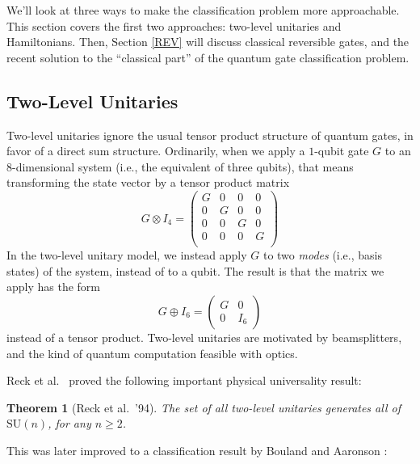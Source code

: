 \documentclass[11pt]{report}
\theoremstyle{plain}
\newtheorem{theorem}{Theorem}[section]
\theoremstyle{definition}
\begin{document}
We'll look at three ways to make the classification problem more approachable. This section covers the first two approaches: two-level unitaries and Hamiltonians.  Then, Section \ref{REV} will discuss classical reversible gates, and the recent solution to the ``classical part'' of the quantum gate classification problem.

\subsection{Two-Level Unitaries}

Two-level unitaries ignore the usual tensor product structure of quantum gates, in favor of a direct sum structure. Ordinarily, when we apply a $1$-qubit gate $G$ to an $8$-dimensional system (i.e., the equivalent of three qubits), that means transforming the state vector by a tensor product matrix
$$
G \otimes I_4 =
\begin{pmatrix}
G & 0 & 0 & 0 \\
0 & G & 0 & 0 \\
0 & 0 & G & 0 \\
0 & 0 & 0 & G \\
\end{pmatrix}
$$
In the two-level unitary model, we instead apply $G$ to two \emph{modes} (i.e., basis states) of the system, instead of to a qubit. The result is that the matrix we apply has the form
$$
G \oplus I_6 =
\begin{pmatrix}
G & 0 \\
0 & I_6
\end{pmatrix}
$$
instead of a tensor product. Two-level unitaries are motivated by beamsplitters, and the kind of quantum computation feasible with optics.

Reck et al.\ \cite{reck} proved the following important physical universality result:

\begin{theorem}[Reck et al.\ '94]
The set of all two-level unitaries generates all of $\mathrm{SU}(n)$, for any $n\ge 2$.
\end{theorem}

This was later improved to a classification result by Bouland and Aaronson \cite{boulandaaronson14}:
\end{document}
